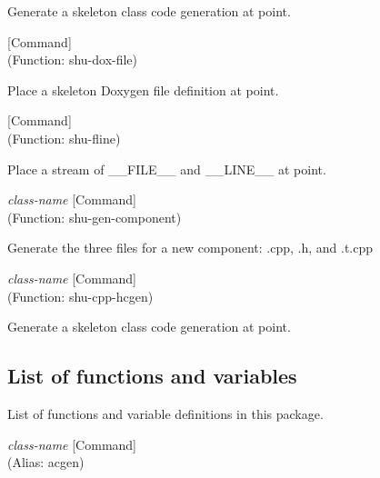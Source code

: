 \begin{doc-string}
Generate a skeleton class code generation at point.
\end{doc-string}

\vspace{1em}
\noindent
{}
\usebox{\funcname}
 \hfill [Command]\\%
 (Function: shu-dox-file)

\begin{doc-string}
Place a skeleton Doxygen file definition at point.
\end{doc-string}

\vspace{1em}
\noindent
{}
\usebox{\funcname}
 \hfill [Command]\\%
 (Function: shu-fline)

\begin{doc-string}
Place a stream of \_\_FILE\_\_ and \_\_LINE\_\_ at point.
\end{doc-string}

\vspace{1em}
\noindent
{}
\usebox{\funcname}\emph{class-name}
 \hfill [Command]\\%
 (Function: shu-gen-component)

\begin{doc-string}
Generate the three files for a new component: .cpp, .h, and .t.cpp
\end{doc-string}

\vspace{1em}
\noindent
{}
\usebox{\funcname}\emph{class-name}
 \hfill [Command]\\%
 (Function: shu-cpp-hcgen)

\begin{doc-string}
Generate a skeleton class code generation at point.
\end{doc-string}

\subsection{List of functions and variables}

List of functions and variable definitions in this package.



\vspace{1em}
\noindent
{}
\usebox{\funcname}\emph{class-name}
 \hfill [Command]\\%
 (Alias: acgen)


